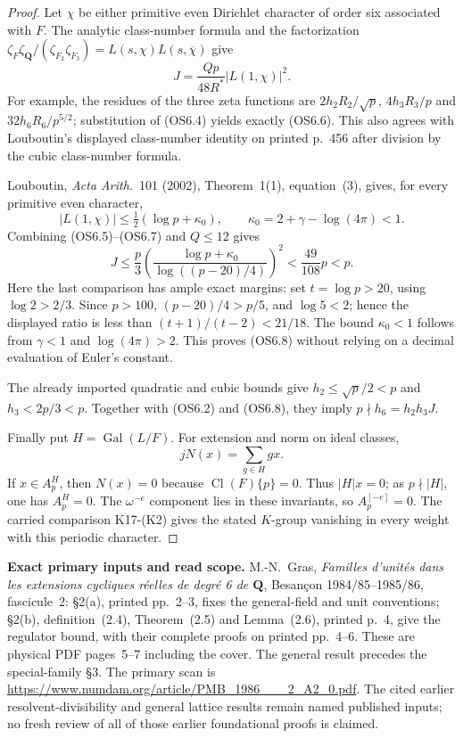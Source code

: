 \documentclass[11pt,a4paper]{article}
\theoremstyle{definition}
\renewcommand{\paragraph}[1]{\par\smallskip\noindent\textbf{#1}\quad\ignorespaces}
\begin{document}
\begin{proof}
Let $\chi$ be either primitive even Dirichlet character of
order six associated with $F$.  The analytic class-number
formula and the factorization
$\zeta_F\zeta_{\mathbf Q}/(\zeta_{F_2}\zeta_{F_3})
=L(s,\chi)L(s,\overline\chi)$ give
\[
                  J=\frac{Qp}{48R^*}|L(1,\chi)|^2.
                                                               \tag{OS6.6}
\]
For example, the residues of the three zeta functions are
$2h_2R_2/\sqrt p$, $4h_3R_3/p$ and
$32h_6R_6/p^{5/2}$; substitution of (OS6.4) yields exactly
(OS6.6).  This also agrees with Louboutin's displayed
class-number identity on printed p.~456 after division
by the cubic class-number formula.

Louboutin, \emph{Acta Arith.}~101 (2002), Theorem~1(1),
equation~(3), gives, for every primitive even character,
\[
 |L(1,\chi)|\le\tfrac12(\log p+\kappa_0),
 \qquad\kappa_0=2+\gamma-\log(4\pi)<1.                \tag{OS6.7}
\]
Combining (OS6.5)--(OS6.7) and $Q\le12$ gives
\[
 J\le\frac p3
       \left(\frac{\log p+\kappa_0}
       {\log((p-20)/4)}\right)^2
   <\frac{49}{108}p<p.                                \tag{OS6.8}
\]
Here the last comparison has ample exact margins: set
$t=\log p>20$, using $\log2>2/3$.  Since $p>100$,
$(p-20)/4>p/5$, and $\log5<2$; hence the displayed
ratio is less than $(t+1)/(t-2)<21/18$.
The bound $\kappa_0<1$ follows from $\gamma<1$ and
$\log(4\pi)>2$.
This proves (OS6.8) without relying on a decimal
evaluation of Euler's constant.

The already imported quadratic and cubic bounds give
$h_2\le\sqrt p/2<p$ and $h_3<2p/3<p$.
Together with (OS6.2) and (OS6.8), they imply
$p\nmid h_6=h_2h_3J$.

Finally put $H=\operatorname{Gal}(L/F)$.
For extension and norm on ideal classes,
\[
                       jN(x)=\sum_{g\in H}g x.         \tag{OS6.9}
\]
If $x\in A_p^H$, then $N(x)=0$ because
$\operatorname{Cl}(F)\{p\}=0$.  Thus $|H|x=0$;
as $p\nmid|H|$, one has $A_p^H=0$.
The $\omega^{-e}$ component lies in these invariants,
so $A_p^{[-e]}=0$.  The carried comparison K17-(K2)
gives the stated $K$-group vanishing in every weight
with this periodic character.
\end{proof}

\paragraph{Exact primary inputs and read scope.}
M.-N.~Gras, \emph{Familles d'unit\'es dans les extensions
cycliques r\'eelles de degr\'e 6 de $\mathbf Q$},
Besan\c con 1984/85--1985/86, fascicule~2:
\S2(a), printed pp.~2--3, fixes the general-field and unit
conventions; \S2(b), definition~(2.4), Theorem~(2.5)
and Lemma~(2.6), printed p.~4, give the regulator bound,
with their complete proofs on printed pp.~4--6.
These are physical PDF pages~5--7 including the cover.
The general result precedes the special-family \S3.
The primary scan is
\url{https://www.numdam.org/article/PMB_1986___2_A2_0.pdf}.
The cited earlier resolvent-divisibility and general
lattice results remain named published inputs; no fresh
review of all of those earlier foundational proofs is claimed.
\end{document}
